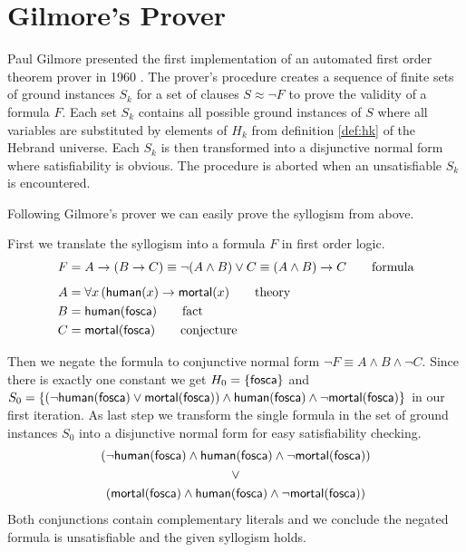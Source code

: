 \section{Gilmore's Prover}

Paul Gilmore presented the first {\myem implementation} of an automated first order theorem prover in 1960 \cite{5392528}.
%
The prover's procedure 
creates a sequence of finite sets of ground instances $S_k$ 
for a set of clauses $S\approx\lnot F$ to prove the validity of a formula $F$.
Each set $S_k$ contains all possible ground instances of $S$ 
where all variables are substituted by elements of $H_k$
from definition \ref{def:hk} of the Hebrand universe.
Each $S_k$ is then transformed into a disjunctive normal form where satisfiability is obvious.
The procedure is aborted when an unsatisfiable $S_k$ is encountered.

Following Gilmore's prover we can easily prove the syllogism from above.

\begin{example}\label{ex:syllo}
	First we translate the syllogism into a formula $F$ in first order logic.
	\begin{align*}
		F &= A \rightarrow (B \rightarrow C) \equiv \lnot(A\land B) \lor C \equiv (A\land B)\rightarrow C  
		\tag*{formula}
		\\[0.5em]
		A &= \forall x\, ( \mathsf{human}(x) \rightarrow \mathsf{mortal}(x) 
		\tag*{theory}
		\\
		B &= \mathsf{human}(\mathsf{fosca}) 
		\tag*{fact}
		\\
		C &= \mathsf{mortal}(\mathsf{fosca})
		\tag*{conjecture}
	\end{align*}
 


	Then we negate the formula to conjunctive normal form $\lnot F \equiv A\land B \land\lnot C$.
	Since there is exactly one constant we get
	$H_0 = \{ \mathsf{fosca} \}$ and 
	$S_0 = 
	\{
	(\lnot\mathsf{human}(\mathsf{fosca})\lor\mathsf{mortal}(\mathsf{fosca}))\land\mathsf{human}(\mathsf{fosca})\land\lnot\mathsf{mortal}(\mathsf{fosca})
	\}$ in our first iteration. 
	As last step we transform the single formula in 
	the set of ground instances $S_0$ into a disjunctive normal form 
	for easy satisfiability checking.
%
\begin{gather*}
(\lnot\mathsf{human}(\mathsf{fosca})\land\mathsf{human}(\mathsf{fosca})\land\lnot\mathsf{mortal}(\mathsf{fosca}))
\\ 
\lor
\\ 
(\mathsf{mortal}(\mathsf{fosca})\land\mathsf{human}(\mathsf{fosca})\land\lnot\mathsf{mortal}(\mathsf{fosca}))
\end{gather*}
Both conjunctions contain complementary literals and we conclude the negated formula is unsatisfiable
 and the given syllogism holds.
 
\end{example}

